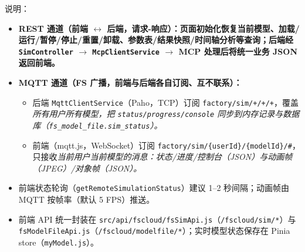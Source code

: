 说明：
\begin{itemize}
	\item \bf{REST 通道}（前端 $\leftrightarrow$ 后端，请求-响应）：页面初始化恢复当前模型、加载/运行/暂停/停止/重置/卸载、参数表/结果快照/时间轴分析等查询；后端经 \texttt{SimController} $\rightarrow$ \texttt{McpClientService} $\rightarrow$ MCP 处理后将统一业务 JSON 返回前端。
	\item \bf{MQTT 通道}（FS 广播，前端与后端各自订阅、互不联系）：
	\begin{itemize}
		\item 后端 \texttt{MqttClientService}（Paho，TCP）订阅 \texttt{factory/sim/+/+/+}，覆盖\it{所有用户所有模型}，把 \texttt{status/progress/console} 同步到内存记录与数据库（\texttt{fs\_model\_file.sim\_status}）。
		\item 前端（mqtt.js，WebSocket）订阅 \texttt{factory/sim/\{userId\}/\{modelId\}/\#}，只接收\it{当前用户当前模型}的消息：状态/进度/控制台（JSON）与动画帧（JPEG）/对象帧（JSON）。
	\end{itemize}
	\item 前端状态轮询（\texttt{getRemoteSimulationStatus}）建议 1--2 秒间隔；动画帧由 MQTT 按帧率（默认 5 FPS）推送。
	\item 前端 API 统一封装在 \texttt{src/api/fscloud/fsSimApi.js}（\texttt{/fscloud/sim/*}）与 \texttt{fsModelFileApi.js}（\texttt{/fscloud/modelfile/*}）；实时模型状态保存在 Pinia store（\texttt{myModel.js}）。
\end{itemize}

